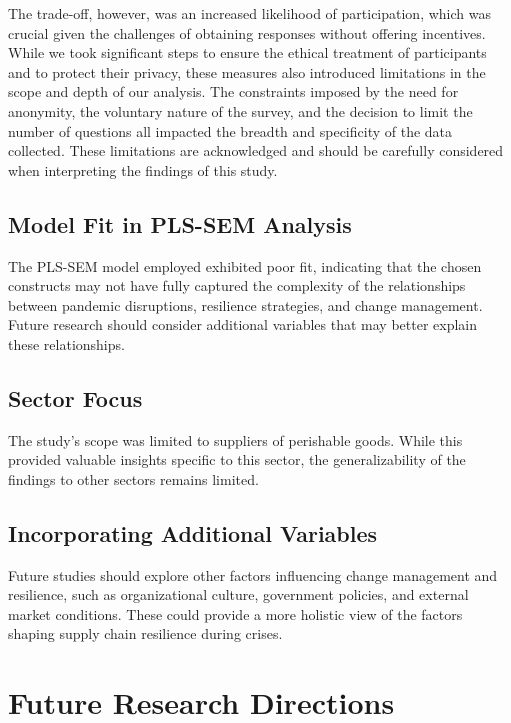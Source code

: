 The trade-off, however, was an increased likelihood of participation, which was crucial given the challenges of obtaining responses without offering incentives. While we took significant steps to ensure the ethical treatment of participants and to protect their privacy, these measures also introduced limitations in the scope and depth of our analysis. The constraints imposed by the need for anonymity, the voluntary nature of the survey, and the decision to limit the number of questions all impacted the breadth and specificity of the data collected. These limitations are acknowledged and should be carefully considered when interpreting the findings of this study.

 

 \subsection{Model Fit in PLS-SEM Analysis}
 The PLS-SEM model employed exhibited poor fit, indicating that the chosen constructs may not have fully captured the complexity of the relationships between pandemic disruptions, resilience strategies, and change management. Future research should consider additional variables that may better explain these relationships.

 

 \subsection{Sector Focus}
 The study's scope was limited to suppliers of perishable goods. While this provided valuable insights specific to this sector, the generalizability of the findings to other sectors remains limited.

 

 \subsection{Incorporating Additional Variables}
 Future studies should explore other factors influencing change management and resilience, such as organizational culture, government policies, and external market conditions. These could provide a more holistic view of the factors shaping supply chain resilience during crises.

 \section{Future Research Directions}

